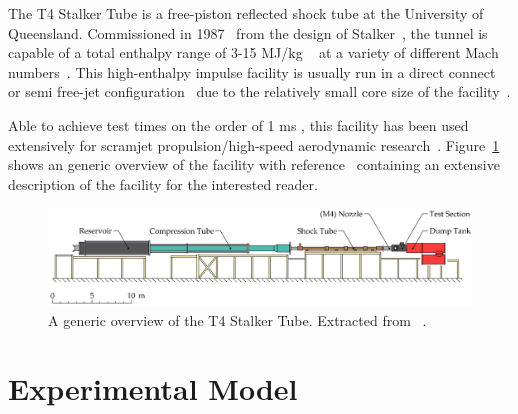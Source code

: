 \documentclass{AIAA}
\begin{document}
The T4 Stalker Tube is a free-piston reflected shock tube at the University of Queensland. 
Commissioned in 1987~\cite{Doherty:PhD_Thesis_Scram_M10} from the design of Stalker~\cite{Stalker1966}, the tunnel is capable of a total enthalpy range of 3-15 MJ/kg ~\cite{Doherty:PhD_Thesis_Scram_M10} at a variety of different Mach numbers~\cite{Tanimizu:Phd_Thesis}.
This high-enthalpy impulse facility is usually run in a direct connect~\cite{Kirchhartz:PhD_Thesis_Boundary_Combustion, RidingsAndrewNoel2015Iops} or semi free-jet configuration~\cite{Chan:Boundary_Layer_Combustion_Perturbation, Wise_Thesis} due to the relatively small core size of the facility~\cite{Itoh1999, Stalker_2005}.


Able to achieve test times on the order of 1 ms \cite{Stalker_2005}, this facility has been used extensively for scramjet propulsion/high-speed aerodynamic research~\cite{Hunt2009, Wise2014b}.
Figure~\ref{fig:T4_Overview} shows an generic overview of the facility with reference~\cite{Doherty:PhD_Thesis_Scram_M10} containing an extensive description of the facility for the interested reader.

\begin{figure}[h]
\centering
	\includegraphics[trim = 0mm 0mm 0mm 0mm, clip, width=0.9\columnwidth]{Figures/T4_Shock_Tunnel_Luke_D_2013.eps}
	\caption{A generic overview of the T4 Stalker Tube. Extracted from ~\cite{Doherty:PhD_Thesis_Scram_M10}.}
	\label{fig:T4_Overview}	
\end{figure}


\section{Experimental Model}
	\label{sec:ModelDescription}
	
\end{document}
